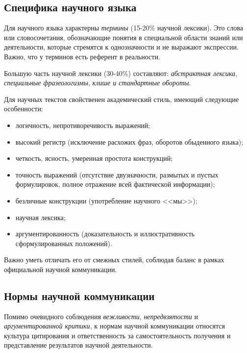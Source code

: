 \subsection{Специфика научного языка}

Для научного языка характерны \textit{термины} (15-20\% научной лексики). Это слова или словосочетания, обозначающие понятия в специальной
области знаний или деятельности, которые стремятся к однозначности и не выражают
экспрессии. Важно, что у терминов есть референт в реальности. 

Большую часть научной лексики (30-40\%) составляют: \textit{абстрактная лексика},
\textit{специальные фразеологизмы}, \textit{клише и стандартные обороты}.

Для научных текстов свойственен академический стиль, имеющий следующие особенности:
\begin{itemize}
    \item логичность, непротиворечивость выражений;
    \item высокий регистр (исключение расхожих фраз, оборотов обыденного языка);
    \item четкость, ясность, умеренная простота конструкций;
    \item точность выражений (отсутствие двузначности, размытых и
    пустых формулировок, полное отражение всей фактической информации);
    \item безличные конструкции (употребление научного <<мы>>);
    \item научная лексика;
    \item аргументированность (доказательность и иллюстративность сформулированных
    положений).
\end{itemize}
Важно уметь отличать его от смежных стилей, соблюдая баланс в рамках официальной научной коммуникации. 


\subsection{Нормы научной коммуникации}

Помимо очевидного соблюдения \textit{вежливости},
\textit{непредвзятости} и \textit{аргументированной критики}, к нормам научной коммуникации относятся культура
цитирования и ответственность за самостоятельность получения и
представление результатов научной деятельности.

